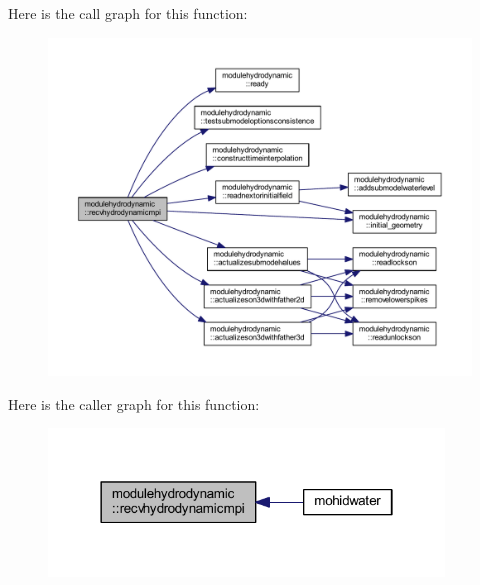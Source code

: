 Here is the call graph for this function\+:\nopagebreak
\begin{figure}[H]
\begin{center}
\leavevmode
\includegraphics[width=350pt]{namespacemodulehydrodynamic_a7093ab7e0b48d35daf4c523567c57d5a_cgraph}
\end{center}
\end{figure}
Here is the caller graph for this function\+:\nopagebreak
\begin{figure}[H]
\begin{center}
\leavevmode
\includegraphics[width=298pt]{namespacemodulehydrodynamic_a7093ab7e0b48d35daf4c523567c57d5a_icgraph}
\end{center}
\end{figure}
\mbox{\label{namespacemodulehydrodynamic_aa08df6c812db6e473c13d11473d2c1ad}} 
